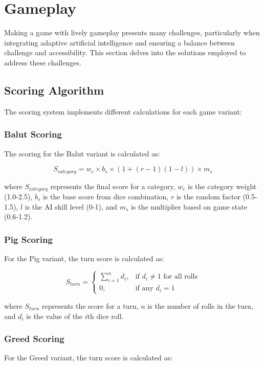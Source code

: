\section{Gameplay}

Making a game with lively gameplay presents many challenges, particularly when integrating adaptive artificial intelligence and ensuring a balance between challenge and accessibility. This section delves into the solutions employed to address these challenges.

\subsection{Scoring Algorithm}

The scoring system implements different calculations for each game variant:

\subsubsection{Balut Scoring}
The scoring for the Balut variant is calculated as:

\begin{equation}
    S_{category} = w_c \times b_s \times (1 + (r - 1)(1 - l)) \times m_s
\end{equation}

where $S_{category}$ represents the final score for a category, $w_c$ is the category weight (1.0-2.5), $b_s$ is the base score from dice combination, $r$ is the random factor (0.5-1.5), $l$ is the AI skill level (0-1), and $m_s$ is the multiplier based on game state (0.6-1.2).

\subsubsection{Pig Scoring}
For the Pig variant, the turn score is calculated as:

\begin{equation}
    S_{turn} = \begin{cases}
        \sum_{i=1}^{n} d_i, & \text{if } d_i \neq 1 \text{ for all rolls} \\
        0, & \text{if any } d_i = 1
    \end{cases}
\end{equation}

where $S_{turn}$ represents the score for a turn, $n$ is the number of rolls in the turn, and $d_i$ is the value of the $i$th dice roll.

\subsubsection{Greed Scoring}
For the Greed variant, the turn score is calculated as:

